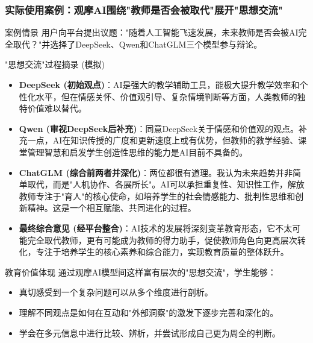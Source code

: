 \documentclass[aspectratio=169]{beamer} %
\begin{document}
\begin{frame}[allowframebreaks]
\frametitle{实际使用案例：观摩AI围绕"教师是否会被取代"展开"思想交流"}
\begin{exampleblock}{案例情景}
    用户向平台提出议题："随着人工智能飞速发展，未来教师是否会被AI完全取代？"并选择了DeepSeek、Qwen和ChatGLM三个模型参与辩论。
\end{exampleblock}

\begin{block}{"思想交流"过程摘录 (模拟)}
\begin{itemize}
    \item \textbf{DeepSeek (初始观点)}：AI是强大的教学辅助工具，能极大提升教学效率和个性化水平，但在情感关怀、价值观引导、复杂情境判断等方面，人类教师的独特价值难以替代。
    \item \textbf{Qwen (审视DeepSeek后补充)}：同意DeepSeek关于情感和价值观的观点。补充一点，AI在知识传授的广度和更新速度上或有优势，但教师的教学经验、课堂管理智慧和启发学生创造性思维的能力是AI目前不具备的。
    \item \textbf{ChatGLM (综合前两者并深化)}：两位都很有道理。我认为未来趋势并非简单取代，而是"人机协作、各展所长"。AI可以承担重复性、知识性工作，解放教师专注于"育人"的核心使命，如培养学生的社会情感能力、批判性思维和创新精神。这是一个相互赋能、共同进化的过程。
    \item \textbf{最终综合意见 (经平台整合)}：AI技术的发展将深刻变革教育形态，它不太可能完全取代教师，更有可能成为教师的得力助手，促使教师角色向更高层次转化，专注于培养学生的核心素养和综合能力，实现教育质量的整体跃升。
\end{itemize}
\end{block}

\begin{alertblock}{教育价值体现}
通过观摩AI模型间这样富有层次的"思想交流"，学生能够：
\begin{itemize}
    \item 真切感受到一个复杂问题可以从多个维度进行剖析。
    \item 理解不同观点是如何在互动和"外部洞察"的激发下逐步完善和深化的。
    \item 学会在多元信息中进行比较、辨析，并尝试形成自己更为周全的判断。
\end{itemize}
\end{alertblock}
\end{frame}
\end{document}
